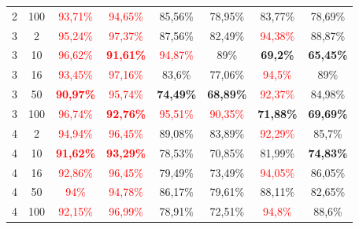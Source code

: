 \begin{table}[ht]
\begin{tabular}{cc|c|c|c|c|c|c}
        {2} & {100} & \textcolor{red}{93,71\%}          & \textcolor{red}{94,65\%}          & {85,56\%}                & {78,95\%}                & {83,77\%}                & {78,69\%}                \\
        {3} & {2}   & \textcolor{red}{95,24\%}          & \textcolor{red}{97,37\%}          & {87,56\%}                & {82,49\%}                & \textcolor{red}{94,38\%} & {88,87\%}                \\
        {3} & {10}  & \textcolor{red}{96,62\%}          & \textcolor{red}{\textbf{91,61\%}} & \textcolor{red}{94,87\%} & {89\%}                   & \textbf{69,2\%}          & \textbf{65,45\%}         \\
        {3} & {16}  & \textcolor{red}{93,45\%}          & \textcolor{red}{97,16\%}          & {83,6\%}                 & {77,06\%}                & \textcolor{red}{94,5\%}  & {89\%}                   \\
        {3} & {50}  & \textcolor{red}{\textbf{90,97\%}} & \textcolor{red}{95,74\%}          & \textbf{74,49\%}         & \textbf{68,89\%}         & \textcolor{red}{92,37\%} & {84,98\%}                \\
        {3} & {100} & \textcolor{red}{96,74\%}          & \textcolor{red}{\textbf{92,76\%}} & \textcolor{red}{95,51\%} & \textcolor{red}{90,35\%} & \textbf{71,88\%}         & \textbf{69,69\%}         \\
        {4} & {2}   & \textcolor{red}{94,94\%}          & \textcolor{red}{96,45\%}          & {89,08\%}                & {83,89\%}                & \textcolor{red}{92,29\%} & {85,7\%}                 \\
        {4} & {10}  & \textcolor{red}{\textbf{91,62\%}} & \textcolor{red}{\textbf{93,29\%}} & {78,53\%}                & {70,85\%}                & {81,99\%}                & \textbf{74,83\%}         \\
        {4} & {16}  & \textcolor{red}{92,86\%}          & \textcolor{red}{96,45\%}          & {79,49\%}                & {73,49\%}                & \textcolor{red}{94,05\%} & {86,05\%}                \\
        {4} & {50}  & \textcolor{red}{94\%}             & \textcolor{red}{94,78\%}          & {86,17\%}                & {79,61\%}                & {88,11\%}                & {82,65\%}                \\
        {4} & {100} & \textcolor{red}{92,15\%}          & \textcolor{red}{96,99\%}          & {78,91\%}                & {72,51\%}                & \textcolor{red}{94,8\%}  & {88,6\%}                 \\

\end{tabular}
\end{table}
